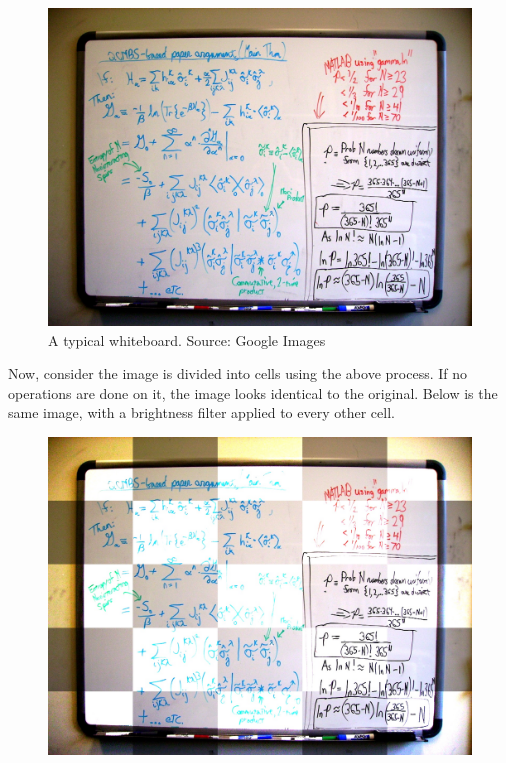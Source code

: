 \documentclass[]{article}
\begin{document}
\begin{figure}[H]
\centering
\includegraphics[scale=0.6]{images/whiteboard}
\caption{A typical whiteboard. Source: Google Images}
\label{fig:whiteboard}
\end{figure}	

Now, consider the image is divided into cells using the above process. If no operations are done on it, the image looks identical to the original.  Below is the same image, with a brightness filter applied to every other cell.

\begin{figure}[H]
\centering
\includegraphics[scale=0.15]{images/cell_brightness_5}
\end{figure}	
\end{document}
